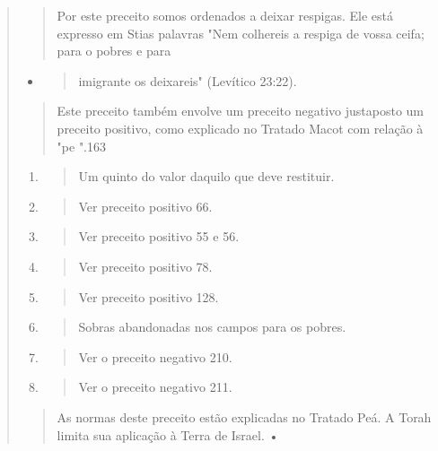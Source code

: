 \begin{quote}
\begin{quote}
Por este preceito somos ordenados a deixar respigas. Ele está expresso
em Stias palavras "Nem colhereis a respiga de vossa ceifa; para o pobres
e para
\end{quote}

\begin{itemize}
\item
 \begin{quote}
 imigrante os deixareis" (Levítico 23:22).
 \end{quote}
\end{itemize}

\begin{quote}
Este preceito também envolve um preceito negativo justaposto um preceito
positivo, como explicado no Tratado Macot com relação à "pe ".163
\end{quote}

\begin{enumerate}
\def\labelenumi{\arabic{enumi}.}
\setcounter{enumi}{155}
\item
 \begin{quote}
 Um quinto do valor daquilo que deve restituir.
 \end{quote}
\item
 \begin{quote}
 Ver preceito positivo 66.
 \end{quote}
\item
 \begin{quote}
 Ver preceito positivo 55 e 56.
 \end{quote}
\item
 \begin{quote}
 Ver preceito positivo 78.
 \end{quote}
\item
 \begin{quote}
 Ver preceito positivo 128.
 \end{quote}
\item
 \begin{quote}
 Sobras abandonadas nos campos para os pobres.
 \end{quote}
\item
 \begin{quote}
 Ver o preceito negativo 210.
 \end{quote}
\item
 \begin{quote}
 Ver o preceito negativo 211.
 \end{quote}
\end{enumerate}

\begin{quote}As normas deste preceito estão explicadas no Tratado Peá. A Torah limita
sua aplicação à Terra de Israel. •


\end{quote}
\end{quote}
